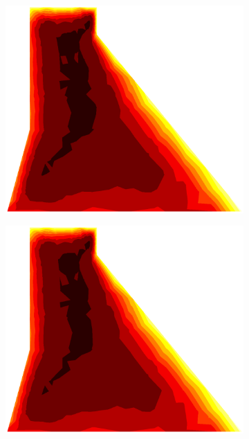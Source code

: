 \documentclass[10pt, a4paper]{article}
\begin{document}
\begin{figure}[H]
\begin{subfigure}[H]{0.19\textwidth}
		\includegraphics[width=1.2\textwidth]{fig/28.eps}
	\end{subfigure}
	\begin{subfigure}[H]{0.19\textwidth}
		\includegraphics[width=1.2\textwidth]{fig/29.eps}
	\end{subfigure}
		\begin{subfigure}[H]{0.19\textwidth}

\end{subfigure}
\end{figure}
\end{document}
